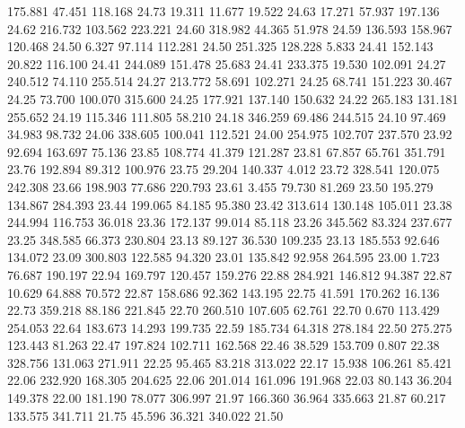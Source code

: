  175.881   47.451  118.168        24.73
  19.311   11.677   19.522        24.63
  17.271   57.937  197.136        24.62
 216.732  103.562  223.221        24.60
 318.982   44.365   51.978        24.59
 136.593  158.967  120.468        24.50
   6.327   97.114  112.281        24.50
 251.325  128.228    5.833        24.41
 152.143   20.822  116.100        24.41
 244.089  151.478   25.683        24.41
 233.375   19.530  102.091        24.27
 240.512   74.110  255.514        24.27
 213.772   58.691  102.271        24.25
  68.741  151.223   30.467        24.25
  73.700  100.070  315.600        24.25
 177.921  137.140  150.632        24.22
 265.183  131.181  255.652        24.19
 115.346  111.805   58.210        24.18
 346.259   69.486  244.515        24.10
  97.469   34.983   98.732        24.06
 338.605  100.041  112.521        24.00
 254.975  102.707  237.570        23.92
  92.694  163.697   75.136        23.85
 108.774   41.379  121.287        23.81
  67.857   65.761  351.791        23.76
 192.894   89.312  100.976        23.75
  29.204  140.337    4.012        23.72
 328.541  120.075  242.308        23.66
 198.903   77.686  220.793        23.61
   3.455   79.730   81.269        23.50
 195.279  134.867  284.393        23.44
 199.065   84.185   95.380        23.42
 313.614  130.148  105.011        23.38
 244.994  116.753   36.018        23.36
 172.137   99.014   85.118        23.26
 345.562   83.324  237.677        23.25
 348.585   66.373  230.804        23.13
  89.127   36.530  109.235        23.13
 185.553   92.646  134.072        23.09
 300.803  122.585   94.320        23.01
 135.842   92.958  264.595        23.00
   1.723   76.687  190.197        22.94
 169.797  120.457  159.276        22.88
 284.921  146.812   94.387        22.87
  10.629   64.888   70.572        22.87
 158.686   92.362  143.195        22.75
  41.591  170.262   16.136        22.73
 359.218   88.186  221.845        22.70
 260.510  107.605   62.761        22.70
   0.670  113.429  254.053        22.64
 183.673   14.293  199.735        22.59
 185.734   64.318  278.184        22.50
 275.275  123.443   81.263        22.47
 197.824  102.711  162.568        22.46
  38.529  153.709    0.807        22.38
 328.756  131.063  271.911        22.25
  95.465   83.218  313.022        22.17
  15.938  106.261   85.421        22.06
 232.920  168.305  204.625        22.06
 201.014  161.096  191.968        22.03
  80.143   36.204  149.378        22.00
 181.190   78.077  306.997        21.97
 166.360   36.964  335.663        21.87
  60.217  133.575  341.711        21.75
  45.596   36.321  340.022        21.50
